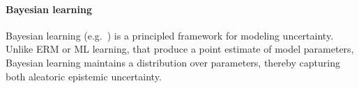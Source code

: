 \paragraph{Bayesian learning}

Bayesian learning (e.g.~\cite{Bishop-PRML-2006,Gelman-Bayesian-2013}) is a principled  framework for modeling uncertainty. Unlike ERM or ML learning, that produce a point estimate of model parameters, Bayesian learning maintains a distribution over parameters, thereby capturing both aleatoric epistemic uncertainty. 

